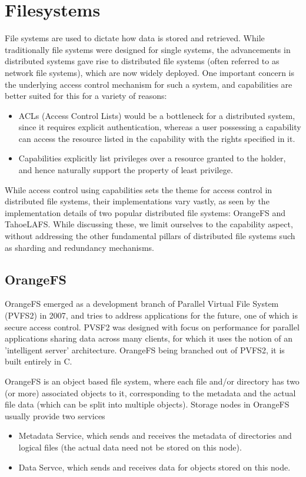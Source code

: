 \section{Filesystems}
\label{sec:filesystem}

File systems are used to dictate how data is stored and retrieved. While traditionally file systems were designed for single systems, the advancements in distributed systems gave rise to distributed file systems (often referred to as network file systems), which are now widely deployed. One important concern is the underlying access control mechanism for such a system, and capabilities are better suited for this for a variety of reasons:~\cite{miltchev2008}
\begin{itemize}
\item ACLs (Access Control Lists) would be a bottleneck for a distributed system, since it requires explicit authentication, whereas a user possessing a capability can access the resource listed in the capability with the rights specified in it.
\item Capabilities explicitly list privileges over a resource granted to the holder, and hence naturally support the property of least privilege.
\end{itemize} 
While access control using capabilities sets the theme for access control in distributed file systems, their implementations vary vastly, as seen by the implementation details of two popular distributed file systems: OrangeFS and TahoeLAFS. While discussing these, we limit ourselves to the capability aspect, without addressing the other fundamental pillars of distributed file systems such as sharding and redundancy mechanisms.

\subsection{ OrangeFS }
OrangeFS emerged as a development branch of Parallel Virtual File System (PVFS2) in 2007, and tries to address applications for the future, one of which is secure access control. PVSF2 was designed with focus on performance for parallel applications sharing data across many clients, for which it uses the notion of an 'intelligent server' architecture. OrangeFS being branched out of PVFS2, it is built entirely in C.

OrangeFS is an object based file system, where each file and/or directory has two (or more) associated objects to it, corresponding to the metadata and the actual file data (which can be split into multiple objects). Storage nodes in OrangeFS usually provide two services
\begin{itemize}
\item Metadata Service, which sends and receives the metadata of directories and logical files (the actual data need not be stored on this node).
\item Data Servce, which sends and receives data for objects stored on this node.
\end{itemize}

